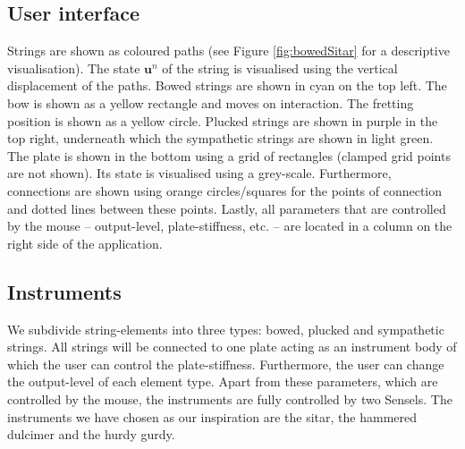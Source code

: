 \documentclass{article}
\begin{document}
\subsection{User interface}
Strings are shown as coloured paths (see Figure \ref{fig:bowedSitar} for a descriptive visualisation). The state $\mathbf{u}^n$ of the string is visualised using the vertical displacement of the paths. Bowed strings are shown in cyan on the top left. The bow is shown as a yellow rectangle and moves on interaction. The fretting position is shown as a yellow circle. Plucked strings are shown in purple in the top right, underneath which the sympathetic strings are shown in light green. The plate is shown in the bottom using a grid of rectangles (clamped grid points are not shown). Its state is visualised using a grey-scale. Furthermore, connections are shown using orange circles/squares for the points of connection and dotted lines between these points. Lastly, all parameters that are controlled by the mouse -- output-level, plate-stiffness, etc. -- are located in a column on the right side of the application.

\subsection{Instruments}
We subdivide string-elements into three types: bowed, plucked and sympathetic strings. All strings will be connected to one plate acting as an instrument body of which the user can control the plate-stiffness. Furthermore, the user can change the output-level of each element type. Apart from these parameters, which are controlled by the mouse, the instruments are fully controlled by two Sensels. The instruments we have chosen as our inspiration are the sitar, the hammered dulcimer and the hurdy gurdy.
\end{document}
